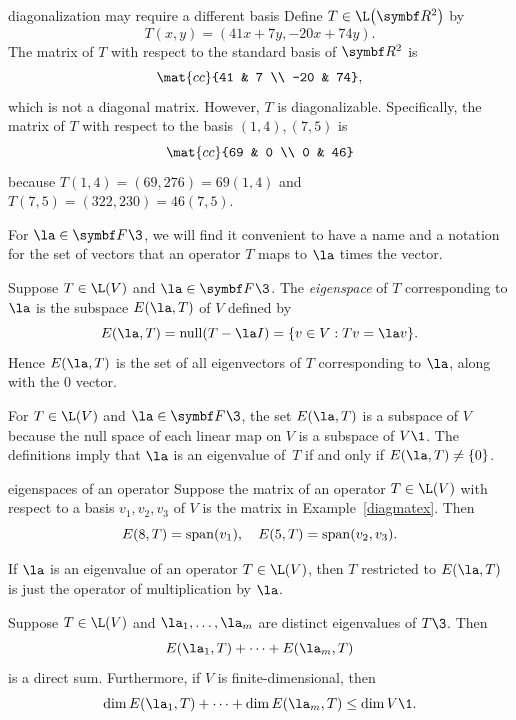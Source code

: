 \begin{example}{diagonalization may require a different basis}
Define $T \in \L\paren[\big]{\R2}$ by
\[
T(x, y) = (41x + 7y, -20x + 74y).
\]
The matrix of $T$ with respect to the standard basis of $\R2$ is
\[
\mat{cc}
{41 & 7 \\
-20 & 74},
\]
which is not a diagonal matrix. However, $T$ is diagonalizable. Specifically, the matrix of $T$ with respect to the basis $ (1,4), (7, 5)$ is
\[
\mat{cc}
{69 & 0 \\
0 & 46}
\]
because $T(1,4) = (69, 276) = 69(1, 4)$ and $T(7, 5) = (322, 230) = 46(7,5)$.
\end{example}

\pagebreak[3]

For $\la \in \F{}\3$, we will find it convenient to have a name and a notation for the set of vectors that an operator $T$ maps to $\la$ times the vector.

{Suppose $T \in \L(V)$ and $\la \in \F{}\3$. The \emph{eigenspace} of $T$ corresponding to $\la$ is the subspace
$E(\la, T)$ of $V$ defined by
\[
E(\la, T) = \ker(T - \la I) = \br{v \in V: Tv = \la v}.
\]
Hence $E(\la, T)$ is the set of all eigenvectors of $T$ corresponding to $\la$, along with the $0$ vector.}

For $T \in \L(V)$ and $\la \in \F{}\3$, the set $E(\la, T)$ is a subspace of $V$ because the null space of each linear map on $V$ is a subspace of $V\1$. The definitions imply that  $\la$ is an eigenvalue of~$T$ if and only if
$E(\la, T) \ne \{0\}$.

\begin{example}{eigenspaces of an operator}
Suppose the matrix of an operator $T \in\L(V)$ with respect to a basis $v_1, v_2, v_3$ of $V$ is the matrix in Example~\ref{diagmatex}. Then
\[
E(8, T) = \operatorname{span}(v_1), \quad E(5, T) = \operatorname{span}(v_2, v_3).
\]
\exampledisplayend
\end{example}

If $\la$ is an eigenvalue of an operator $T \in \L(V)$, then $T$ restricted to $E(\la, T)$ is just the operator of multiplication by $\la$.

{Suppose $T \in \L(V)$ and $\la_1, \dots, \la_m$ are distinct eigenvalues of $T\3$. Then
\[
E(\la_1, T) + \dots + E(\la_m, T)
\]
is a direct sum. Furthermore, if $V$ is finite-dimensional, then
\[
\dim E(\la_1, T) + \dots + \dim E(\la_m, T) \le \dim V\1.
\]}

